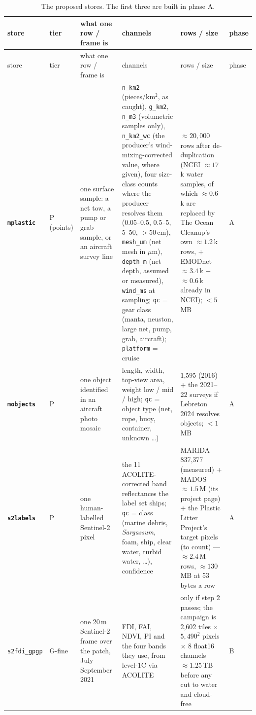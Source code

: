 \documentclass[10pt]{article}
\newcommand{\code}[1]{\texttt{#1}}
\begin{document}
{\setlength{\tabcolsep}{2pt}\scriptsize
\begin{longtable}{@{}L{1.8cm}L{1.0cm}L{2.9cm}L{4.8cm}L{4.1cm}L{0.75cm}@{}}
\caption{The proposed stores. The first three are built in phase A.} \label{tab:stores}\\
\toprule
store & tier & what one row / frame is & channels & rows / size & phase \\
\midrule
\endfirsthead
\toprule
store & tier & what one row / frame is & channels & rows / size & phase \\
\midrule
\endhead
\textbf{\code{mplastic}} & P (points) & one surface sample: a net tow, a pump or grab sample, or an aircraft survey
line & \code{n\_km2} (pieces/km$^2$, as caught), \code{g\_km2}, \code{n\_m3} (volumetric samples only),
\code{n\_km2\_wc} (the producer's wind-mixing-corrected value, where given), four size-class counts where the
producer resolves them (0.05--0.5, 0.5--5, 5--50, $> 50$\,cm), \code{mesh\_um} (net mesh in $\mu$m),
\code{depth\_m} (net depth, assumed or measured), \code{wind\_ms} at sampling; \code{qc} = gear class (manta,
neuston, large net, pump, grab, aircraft); \code{platform} = cruise & $\approx 20,000$ rows after de-duplication
(NCEI $\approx 17$\,k water samples, of which $\approx 0.6$\,k are replaced by The Ocean Cleanup's own
$\approx 1.2$\,k rows, + EMODnet $\approx 3.4$\,k $-$ $\approx 0.6$\,k already in NCEI); $< 5$\,MB & A \\
\addlinespace
\textbf{\code{mobjects}} & P & one object identified in an aircraft photo mosaic & length, width, top-view area,
weight low / mid / high; \code{qc} = object type (net, rope, buoy, container, unknown \dots) & 1,595 (2016) + the
2021--22 surveys if Lebreton 2024 resolves objects; $< 1$\,MB & A \\
\addlinespace
\textbf{\code{s2labels}} & P & one human-labelled Sentinel-2 pixel & the 11 ACOLITE-corrected band reflectances the
label set ships; \code{qc} = class (marine debris, \emph{Sargassum}, foam, ship, clear water, turbid water, \dots),
confidence & MARIDA 837,377 (measured) + MADOS $\approx 1.5$\,M (its project page) + the Plastic Litter Project's
target pixels (to count) --- $\approx 2.4$\,M rows, $\approx 130$\,MB at 53 bytes a row & A \\
\addlinespace
\code{s2fdi\_gpgp} & G-fine & one 20\,m Sentinel-2 frame over the patch, July--September 2021 & FDI, FAI, NDVI,
PI and the four bands they use, from level-1C via ACOLITE & only if step 2 passes; the campaign is 2,602 tiles
$\times$ $5,490^2$ pixels $\times$ 8 float16 channels $\approx 1.25$\,TB before any cut to water and cloud-free & B \\

\end{longtable}}
\end{document}
